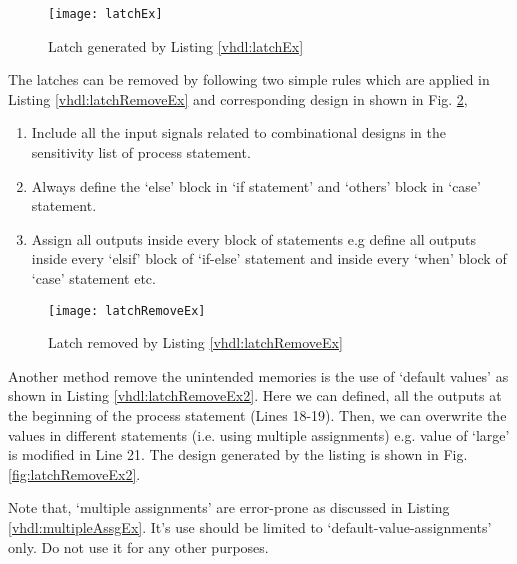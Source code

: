 

\begin{figure}[!h]
	\centering
	\texttt{[image: latchEx]}
	\caption{Latch generated by Listing \ref{vhdl:latchEx}}
	\label{fig:latchEx}
\end{figure}


\begin{noNumBox}
	The latches can be removed by following two simple rules which are applied in Listing \ref{vhdl:latchRemoveEx} and corresponding design in shown in Fig. \ref{fig:latchRemoveEx}, 
	\begin{enumerate}
		\item Include all the input signals related to combinational designs in the sensitivity list of process statement. 
		\item Always define the `else' block in `if statement' and `others' block in `case' statement. 
		\item Assign all outputs inside every block of statements e.g define all outputs inside every `elsif' block of `if-else' statement and inside every  `when' block of `case' statement etc. 
	\end{enumerate}
\end{noNumBox}



\begin{figure}
	\centering
	\texttt{[image: latchRemoveEx]}
	\caption{Latch removed by Listing \ref{vhdl:latchRemoveEx}}
	\label{fig:latchRemoveEx}
\end{figure}


Another method remove the unintended memories is the use of `default values' as shown in Listing \ref{vhdl:latchRemoveEx2}. Here we can defined, all the outputs at the beginning of the process statement (Lines 18-19). Then, we can overwrite the values in different statements (i.e. using multiple assignments) e.g. value of `large' is modified in Line 21. The design generated by the listing is shown in Fig. \ref{fig:latchRemoveEx2}. 

\begin{noNumBox}
	Note that, `multiple assignments' are error-prone as discussed in Listing \ref{vhdl:multipleAssgEx}. It's use should be limited to `default-value-assignments' only. Do not use it for any other purposes.   
\end{noNumBox}

